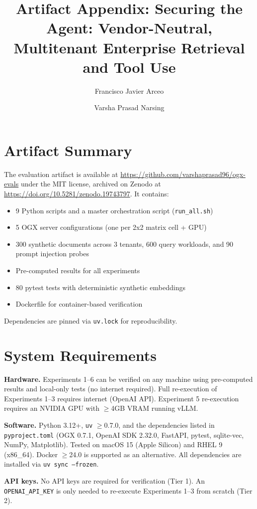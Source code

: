 \documentclass[sigconf]{acmart}
\title{Artifact Appendix: Securing the Agent: Vendor-Neutral, Multitenant Enterprise Retrieval and Tool Use}
\author{Francisco Javier Arceo}
\affiliation{%
  \institution{Red Hat AI}
  \city{Boston}
  \country{USA}
}
\author{Varsha Prasad Narsing}
\affiliation{%
  \institution{Red Hat AI}
  \city{Boston}
  \country{USA}
}
\begin{document}
\maketitle

\section{Artifact Summary}

The evaluation artifact is available at {\color{blue}\url{https://github.com/varshaprasad96/ogx-evals}} under the MIT license, archived on Zenodo at {\color{blue}\url{https://doi.org/10.5281/zenodo.19743797}}. It contains:
\begin{itemize}
  \item 9 Python scripts and a master orchestration script (\texttt{run\_all.sh})
  \item 5 OGX server configurations (one per 2x2 matrix cell + GPU)
  \item 300 synthetic documents across 3 tenants, 600 query workloads, and 90 prompt injection probes
  \item Pre-computed results for all experiments
  \item 80 pytest tests with deterministic synthetic embeddings
  \item Dockerfile for container-based verification
\end{itemize}
\noindent Dependencies are pinned via \texttt{uv.lock} for reproducibility.

\section{System Requirements}

\textbf{Hardware.} Experiments 1--6 can be verified on any machine using pre-computed results and local-only tests (no internet required). Full re-execution of Experiments 1--3 requires internet (OpenAI API). Experiment 5 re-execution requires an NVIDIA GPU with ${\geq}$4GB VRAM running vLLM.

\textbf{Software.} Python 3.12+, \texttt{uv} ${\geq}$0.7.0, and the dependencies listed in \texttt{pyproject.toml} (OGX 0.7.1, OpenAI SDK 2.32.0, FastAPI, pytest, sqlite-vec, NumPy, Matplotlib). Tested on macOS 15 (Apple Silicon) and RHEL 9 (x86\_64). Docker ${\geq}$24.0 is supported as an alternative. All dependencies are installed via \texttt{uv sync --frozen}.

\textbf{API keys.} No API keys are required for verification (Tier 1). An \texttt{OPENAI\_API\_KEY} is only needed to re-execute Experiments 1--3 from scratch (Tier 2).
\end{document}
